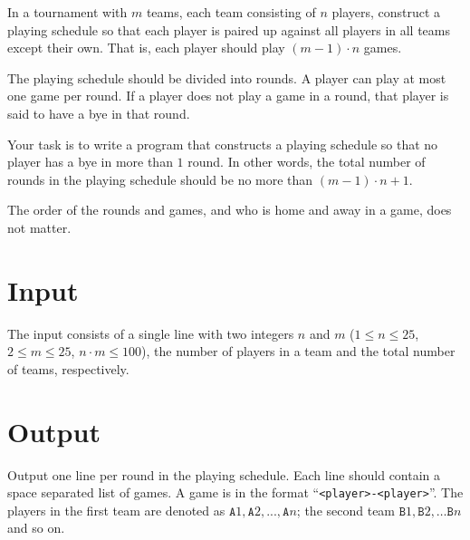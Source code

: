 
%
\noindent
In a tournament with $m$ teams, each team consisting of $n$ players,
construct a playing schedule so that each player is paired up against all players in all teams except their own. That is, each player should play $(m-1) \cdot n$ games.

The playing schedule should be divided into rounds. A player can play at most one game per round. If a player does not play a game in a round, that player is said to have a bye in that round.

Your task is to write a program that constructs a playing schedule so that no player has a bye in more than $1$ round. In other words, the total number of rounds in the playing schedule should be no more than $(m-1) \cdot n  + 1$.

The order of the rounds and games, and who is home and away in a game, does not matter.

\section*{Input}

The input consists of a single line with two integers $n$ and $m$ ($1 \le n \le 25$, $2 \le m \le 25$, $n \cdot m \le 100$), the number of players in a team and the total number of teams, respectively.

\section*{Output}

Output one line per round in the playing schedule. Each line should contain a space separated list of games. A game is in the format ``\texttt{<player>-<player>}''. The players in the first team are denoted as $\texttt{A}1, \texttt{A}2, ..., \texttt{A}n$; the second team $\texttt{B}1, \texttt{B}2, \ldots \texttt{B}n$ and so on.
